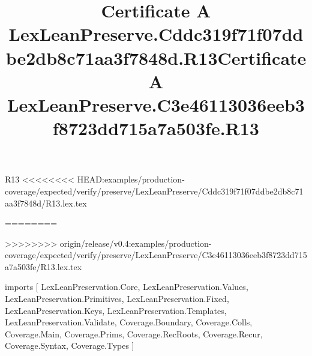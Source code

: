 \begin{lexlean}{R13}
<<<<<<<< HEAD:examples/production-coverage/expected/verify/preserve/LexLeanPreserve/Cddc319f71f07ddbe2db8c71aa3f7848d/R13.lex.tex
\title{Certificate A LexLeanPreserve.Cddc319f71f07ddbe2db8c71aa3f7848d.R13}
========
\title{Certificate A LexLeanPreserve.C3e46113036eeb3f8723dd715a7a503fe.R13}
>>>>>>>> origin/release/v0.4:examples/production-coverage/expected/verify/preserve/LexLeanPreserve/C3e46113036eeb3f8723dd715a7a503fe/R13.lex.tex
\begin{coremodule}
imports [
  LexLeanPreservation.Core,
  LexLeanPreservation.Values,
  LexLeanPreservation.Primitives,
  LexLeanPreservation.Fixed,
  LexLeanPreservation.Keys,
  LexLeanPreservation.Templates,
  LexLeanPreservation.Validate,
  Coverage.Boundary,
  Coverage.Colls,
  Coverage.Main,
  Coverage.Prims,
  Coverage.RecRoots,
  Coverage.Recur,
  Coverage.Syntax,
  Coverage.Types
]


\end{coremodule}
\end{lexlean}
